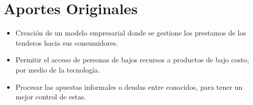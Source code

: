 \section{Aportes Originales}

	\begin{itemize}
		
		\item Creación de un modelo empresarial donde se gestione los prestamos de los tenderos hacia sus consumidores.
		
		\item Permitir el acceso de personas de bajos recursos a productos de bajo costo, por medio de la tecnología.
		
		\item Procesar las apuestas informales o deudas entre conocidos, para tener un mejor control de estas.
		
	\end{itemize}